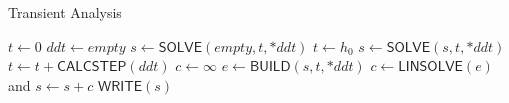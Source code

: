 \begin{algorithm}[ht]
    \caption{Transient Analysis}
    \begin{algorithmic}[1]
            \State $t \gets 0$
            \State $ddt \gets empty$ 
            \State $s \gets \textsf{SOLVE}(empty,t,*ddt)$ 
            \State $t \gets h_0$
                \State $s \gets \textsf{SOLVE}(s,t,*ddt)$
                \State $t \gets t + \textsf{CALCSTEP}(ddt)$
            \EndWhile
        \EndProcedure
            \State $c \gets \infty$
                \State $e \gets \textsf{BUILD}(s,t,*ddt)$
                \State $c \gets \textsf{LINSOLVE}(e)$ and $s \gets s + c$
            \EndWhile
            \State $\textsf{WRITE}(s)$
        \EndProcedure
    \end{algorithmic}
    \label{alg:trans}
\end{algorithm}

